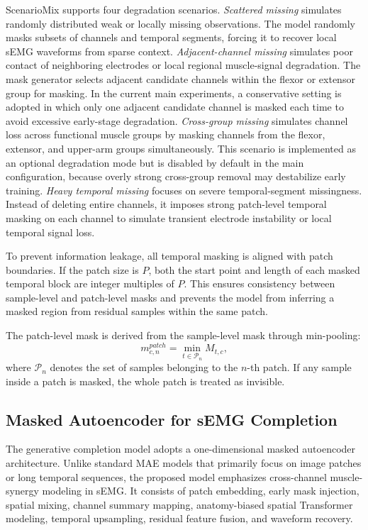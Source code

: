 \documentclass[journal]{IEEEtran}
\begin{document}
ScenarioMix supports four degradation scenarios. \emph{Scattered missing} simulates randomly distributed weak or locally missing observations. The model randomly masks subsets of channels and temporal segments, forcing it to recover local sEMG waveforms from sparse context. \emph{Adjacent-channel missing} simulates poor contact of neighboring electrodes or local regional muscle-signal degradation. The mask generator selects adjacent candidate channels within the flexor or extensor group for masking. In the current main experiments, a conservative setting is adopted in which only one adjacent candidate channel is masked each time to avoid excessive early-stage degradation. \emph{Cross-group missing} simulates channel loss across functional muscle groups by masking channels from the flexor, extensor, and upper-arm groups simultaneously. This scenario is implemented as an optional degradation mode but is disabled by default in the main configuration, because overly strong cross-group removal may destabilize early training. \emph{Heavy temporal missing} focuses on severe temporal-segment missingness. Instead of deleting entire channels, it imposes strong patch-level temporal masking on each channel to simulate transient electrode instability or local temporal signal loss.

To prevent information leakage, all temporal masking is aligned with patch boundaries. If the patch size is $P$, both the start point and length of each masked temporal block are integer multiples of $P$. This ensures consistency between sample-level and patch-level masks and prevents the model from inferring a masked region from residual samples within the same patch.

The patch-level mask is derived from the sample-level mask through min-pooling:
\begin{equation}
m^{patch}_{c,n} = \min_{t \in \mathcal{P}_n} M_{t,c},
\end{equation}
where $\mathcal{P}_n$ denotes the set of samples belonging to the $n$-th patch. If any sample inside a patch is masked, the whole patch is treated as invisible.

\subsection{Masked Autoencoder for sEMG Completion}
The generative completion model adopts a one-dimensional masked autoencoder architecture. Unlike standard MAE models that primarily focus on image patches or long temporal sequences, the proposed model emphasizes cross-channel muscle-synergy modeling in sEMG. It consists of patch embedding, early mask injection, spatial mixing, channel summary mapping, anatomy-biased spatial Transformer modeling, temporal upsampling, residual feature fusion, and waveform recovery.
\end{document}
